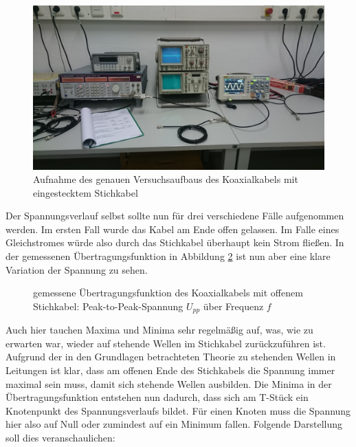 		\begin{figure}[H]
			\center
			\includegraphics[scale = 0.09]{messwerte/DSC_0553.JPG}
			\caption{\centering Aufnahme des genauen Versuchsaufbaus des Koaxialkabels mit eingestecktem Stichkabel} %
			\label{versuchsaufbau_stichkabel}
		\end{figure}

		Der Spannungsverlauf selbst sollte nun für drei verschiedene Fälle aufgenommen werden.
		Im ersten Fall wurde das Kabel am Ende offen gelassen.
		Im Falle eines Gleichstromes würde also durch das Stichkabel überhaupt kein Strom fließen.
		In der gemessenen Übertragungsfunktion in Abbildung \ref{diagramm_stichkabel_offen} ist nun aber eine klare Variation der Spannung zu sehen.

		\begin{figure}[H]
			\center
			
			\caption{\centering gemessene Übertragungsfunktion des Koaxialkabels mit offenem Stichkabel: Peak-to-Peak-Spannung $U_{pp}$ über Frequenz $f$} %
			\label{diagramm_stichkabel_offen}
		\end{figure}

		Auch hier tauchen Maxima und Minima sehr regelmäßig auf, was, wie zu erwarten war, wieder auf stehende Wellen im Stichkabel zurückzuführen ist.
		Aufgrund der in den Grundlagen betrachteten Theorie zu stehenden Wellen in Leitungen ist klar, dass am offenen Ende des Stichkabels die Spannung immer maximal sein muss, damit sich stehende Wellen ausbilden.
		Die Minima in der Übertragungsfunktion entstehen nun dadurch, dass sich am T-Stück ein Knotenpunkt des Spannungsverlaufs bildet.
		Für einen Knoten muss die Spannung hier also auf Null oder zumindest auf ein Minimum fallen.
		Folgende Darstellung soll dies veranschaulichen:

